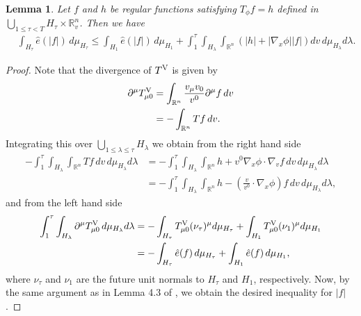 \documentclass{article}
\newtheorem{lemma}{Lemma}[section]
\newcommand{\bbr}{{\mathbb R}}
\newcommand{\bbrn}{{\bbr^n}}
\newcommand{\rV}{{\rm V}}
\begin{document}
%
\begin{lemma} \label{lem intchif}
Let $ f $ and $ h $ be regular functions satisfying $ T_\phi f = h $ defined in $ \bigcup_{ 1 \leq \tau < T } H_\tau \times \bbr^n_v $. Then we have
\begin{align*}
& \int_{ H_\tau } \hat{ e } ( | f |) \, d \mu_{ H_\tau } \leq \int_{ H_1 } \hat{ e } ( | f | ) \, d \mu_{ H_1 } + \int_1^\tau \int_{ H_\lambda } \int_\bbrn \left( | h | + | \nabla_x \phi | | f | \right) d v \, d \mu_{ H_\lambda } d \lambda .
\end{align*}
\end{lemma}
\begin{proof}
Note that the divergence of $ T^\rV $ is given by
\begin{align*}
\partial^\mu T^\rV_{ \mu 0 } & = \int_\bbrn \frac{ v_\mu v_0 }{ v^0 } \partial^\mu f \, d v \\
& = - \int_\bbrn T f \, d v .
\end{align*}
Integrating this over $ \bigcup_{ 1 \leq \lambda \leq \tau } H_\lambda $ we obtain from the right hand side
\begin{align*}
- \int_1^\tau \int_{ H_\lambda } \int_\bbrn T f \, d v \, d \mu_{ H_\lambda } d \lambda & = - \int_1^\tau \int_{ H_\lambda } \int_\bbrn h + v^0 \nabla_x \phi \cdot \nabla_v f \, d v \, d \mu_{ H_\lambda } d \lambda \\
& = - \int_1^\tau \int_{ H_\lambda } \int_\bbrn h - \left( \frac{ v }{ v^0 } \cdot \nabla_x \phi \right) f \, dv \, d \mu_{H_\lambda} d \lambda ,
\end{align*}
and from the left hand side
\begin{align*}
\int_1^\tau \int_{ H_\lambda } \partial^\mu T^\rV_{ \mu 0 } \, d \mu_{H_\lambda} d \lambda & = - \int_{ H_\tau } T^\rV_{ \mu 0 } ( \nu_\tau )^\mu d \mu_{ H_\tau } + \int_{ H_1 } T^\rV_{ \mu 0 } ( \nu_1 )^\mu d \mu_{ H_1 } \\
& = - \int_{ H_\tau } \hat{ e } ( f ) \, d \mu_{ H_\tau } + \int_{ H_1 } \hat{ e } ( f ) \, d \mu_{ H_1 } ,
\end{align*}
where $ \nu_\tau $ and $ \nu_1 $ are the future unit normals to $ H_\tau $ and $ H_1 $, respectively. Now, by the same argument as in Lemma 4.3 of \cite{FJS17}, we obtain the desired inequality for $ | f | $.
\end{proof}


%
\end{document}
